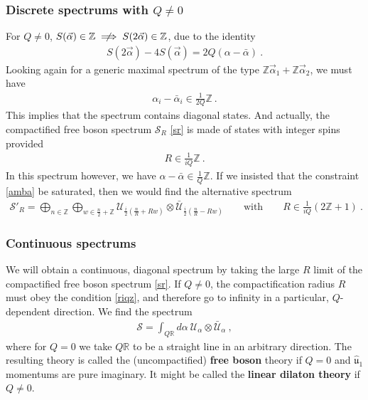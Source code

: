 \documentclass[12pt, a4paper, notitlepage, twoside]{report}
\numberwithin{equation}{section}
\theoremstyle{break}
\begin{document}
\subsubsection{Discrete spectrums with $Q\neq 0$}

For $Q\neq 0$, $S(\vec\alpha)\in\mathbb{Z}\centernot\implies S(2\vec\alpha)\in\mathbb{Z}$, due to the identity
\begin{align}
 S(2\vec\alpha) - 4 S(\vec\alpha) = 2Q(\alpha-\bar \alpha)\ .
\end{align}
Looking again for a generic maximal spectrum of the type $\mathbb{Z}\vec\alpha_1 + \mathbb{Z}\vec\alpha_2$, we must have 
\begin{align}
 \alpha_i-\bar\alpha_i\in \frac{1}{2Q}\mathbb{Z}\ .
 \label{amba}
\end{align}
This implies that the spectrum contains diagonal states. And actually, the compactified free boson spectrum $\mathcal{S}_R$ \eqref{sr} is made of states with integer spins provided
\begin{align}
 R \in \frac{1}{iQ}\mathbb{Z}\ .
 \label{riqz}
\end{align}
In this spectrum however, we have $\alpha-\bar\alpha\in\frac{1}{Q}\mathbb{Z}$. 
If we insisted that the constraint \eqref{amba} be saturated, then we would find the alternative spectrum
\begin{align}
 \mathcal{S}'_R = \bigoplus_{n\in \mathbb{Z}} \bigoplus_{w\in \frac{n}{2}+\mathbb{Z}} \mathcal{U}_{\frac{i}{2}\left(\frac{n}{R} + Rw\right)} \otimes \bar{\mathcal{U}}_{\frac{i}{2}\left(\frac{n}{R} - Rw\right)} \qquad \text{with}\qquad R \in \frac{1}{iQ}(2\mathbb{Z}+1)\ .
\end{align}


\subsubsection{Continuous spectrums}

We will obtain a continuous, diagonal spectrum by taking 
the large $R$ limit of the compactified free boson spectrum \eqref{sr}.
If $Q\neq 0$, the compactification radius $R$ must obey the condition \eqref{riqz}, and therefore go to infinity in a particular, $Q$-dependent direction. We find the spectrum 
\begin{align}
 \boxed{ \mathcal{S} = \int_{Q\mathbb{R}} d\alpha\ \mathcal{U}_\alpha\otimes \bar{\mathcal{U}}_\alpha}\ ,
 \label{sc}
\end{align}
where for $Q=0$ we take $Q\mathbb{R}$ to be a straight line in an arbitrary direction.  
The resulting theory is called the (uncompactified) \textbf{\boldmath free boson} theory if $Q=0$ and $\hat{\mathfrak{u}}_1$ momentums are pure imaginary. It might be called the \textbf{\boldmath linear dilaton theory} if $Q\neq 0$. 
\end{document}

